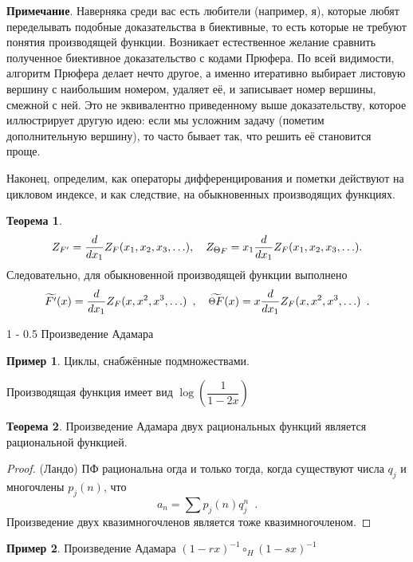\documentclass{article}
\makeatletter
\def \point {\raisebox{.1\height}{\scalebox{0.8}{$\Theta$}}}
\theoremstyle{definition}
\newtheorem{example}{Пример}
\newtheorem*{theorem}{Теорема}
\renewcommand{\subsection}{\@startsection
{subsection}%
{1}%
{\z@}%
{-\baselineskip}%
{0.5\baselineskip}%
{\centering\large\scshape}} %
\makeatother
\begin{document}
{\footnotesize
\textbf{Примечание}. Наверняка среди вас есть любители (например, я), которые
любят переделывать подобные доказательства в биективные, то есть которые не
требуют понятия производящей функции. Возникает естественное желание сравнить
полученное биективное доказательство с кодами Прюфера. По всей видимости,
алгоритм Прюфера делает нечто другое, а именно итеративно выбирает листовую вершину с
наибольшим номером, удаляет её, и записывает номер вершины, смежной с ней. Это
не эквивалентно приведенному выше доказательству, которое иллюстрирует другую
идею: если мы усложним задачу (пометим дополнительную вершину), то часто бывает
так, что решить её становится проще.}

Наконец, определим, как операторы дифференцирования и пометки действуют на
цикловом индексе, и как следствие, на обыкновенных производящих функциях.
\begin{theorem}
\[
    Z_{F'} = \dfrac{d}{dx_1} Z_F(x_1, x_2, x_3, \ldots), \quad
    Z_{\point F} = x_1 \dfrac{d}{d x_1} Z_F(x_1, x_2, x_3, \ldots). 
\]
Следовательно, для обыкновенной производящей функции выполнено
\[
    \widetilde{F'}(x) = \dfrac{d}{dx_1} Z_F(x, x^2, x^3, \ldots)\enspace ,
\quad
    \widetilde{\point F}(x) = x \dfrac{d}{dx_1} Z_F(x, x^2, x^3, \ldots)
\enspace .
\]
\end{theorem}
\subsection{Произведение Адамара}

\begin{example}
	Циклы, снабжённые подмножествами. 
	
	Производящая функция имеет вид \( \log \left( \dfrac{1}{1 - 2x} \right) \)
\end{example}

\begin{theorem}
	Произведение Адамара двух рациональных функций является рациональной 
	функцией.
\end{theorem}

\begin{proof} (Ландо)
	ПФ рациональна огда и только тогда, когда существуют числа \( q_j \) и 
	многочлены \( p_j(n) \), что
	\[
		a_n = \sum p_j(n)q_j^n \enspace .
	\]
	Произведение двух квазимногочленов является тоже квазимногочленом.
\end{proof}

\begin{example}
	Произведение Адамара \( (1 - rx)^{-1} \circ_{H} (1 - sx)^{-1}\)
\end{example}
\end{document}
